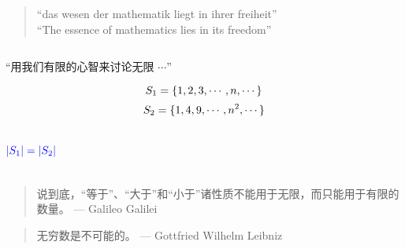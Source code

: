 \begin{frame}{}

  \pause
  \begin{quote}
    \begin{center}
    ``das wesen der mathematik liegt in ihrer freiheit'' \\[8pt]
    \pause
    ``The essence of mathematics lies in its freedom''
    \end{center}
  \end{quote}
\end{frame}

\begin{frame}{}
  \begin{columns}
  \end{columns}
\end{frame}

\begin{frame}{}
  \centerline{``用我们有限的心智来讨论无限 $\cdots$''}

  \[
    S_1 = \{1, 2, 3, \cdots, n, \cdots\}
  \]
  \[
    S_2 = \{1, 4, 9, \cdots, n^2, \cdots\}
  \]

  \begin{columns}
      \pause
      \[
	\textcolor{blue}{|S_1| = |S_2|}
      \]

      \pause
      \centerline{}
      \pause
  \end{columns}

  \pause
  \vspace{0.20cm}
  \begin{quote}
    说到底，``等于''、``大于''和``小于''诸性质不能用于无限，而只能用于有限的数量。 \hfill --- Galileo Galilei
  \end{quote}

  \pause
  \vspace{0.20cm}
  \begin{quote}
    无穷数是不可能的。 \hfill --- Gottfried Wilhelm Leibniz
  \end{quote}
\end{frame}

